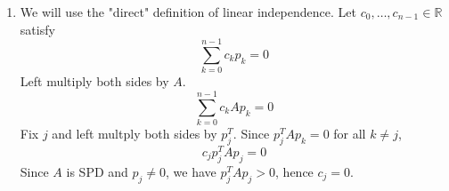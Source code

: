 \documentclass{article}
\def\mbb#1{\mathbb{#1}}
\def\bR{\mbb{R}}
\begin{document}
\begin{enumerate}
	
	
	\pagebreak
	
	
	
	\item We will use the "direct" definition of linear independence. Let $c_0,\dots,c_{n-1}\in\bR$ satisfy
	\[\sum_{k=0}^{n-1}c_kp_k = 0\]
	Left multiply both sides by $A$.
	\[\sum_{k=0}^{n-1}c_kAp_k = 0\]
	Fix $j$ and left multply both sides by $p_j^T$. Since $p_j^TAp_k=0$ for all $k\ne j$,
	\[c_jp_j^TAp_j = 0\]
	Since $A$ is SPD and $p_j\ne0$, we have $p_j^TAp_j>0$, hence $c_j=0$.
	
	
	
\end{enumerate}
	
	
	
\end{document}
